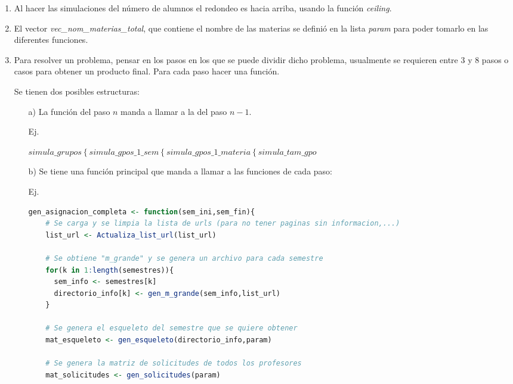 \begin{appendices}
\begin{enumerate}
  \item Al hacer las simulaciones del número de alumnos el redondeo es hacia arriba, usando la función \textit{ceiling}.
  
  \item El vector \textit{vec\_nom\_materias\_total}, que contiene el nombre de las materias se definió en la lista \textit{param} para poder tomarlo en las diferentes funciones.
  
  \item Para resolver un problema, pensar en los pasos en los que se puede dividir dicho problema, usualmente se requieren entre 3 y 8 pasos o casos para obtener un producto final. Para cada paso hacer una función. 
  
  Se tienen dos posibles estructuras:
  
  \begin{itemize}
  \item[a)] La función del paso $n$ manda a llamar a la del paso $n-1$.
  
  Ej.

  $\textit{simula\_grupos} \left\{ \textit{simula\_gpos\_1\_sem}\right. \left\{ \textit{simula\_gpos\_1\_materia}\right. \left\{ \textit{simula\_tam\_gpo}\right.$\\
  
  \item[b)] Se tiene una función principal que manda a llamar a las funciones de cada paso:
  
  Ej.

  \begin{lstlisting}[language=R, caption= \textit{Ejemplo de estructura de funciones}]
  gen_asignacion_completa <- function(sem_ini,sem_fin){   
    # Se carga y se limpia la lista de urls (para no tener paginas sin informacion,...)
    list_url <- Actualiza_list_url(list_url)
    
    # Se obtiene "m_grande" y se genera un archivo para cada semestre
    for(k in 1:length(semestres)){
      sem_info <- semestres[k]
      directorio_info[k] <- gen_m_grande(sem_info,list_url)
    }
    
    # Se genera el esqueleto del semestre que se quiere obtener
    mat_esqueleto <- gen_esqueleto(directorio_info,param)
        
    # Se genera la matriz de solicitudes de todos los profesores
    mat_solicitudes <- gen_solicitudes(param)
    

\end{lstlisting}
\end{itemize}
\end{enumerate}
\end{appendices}
